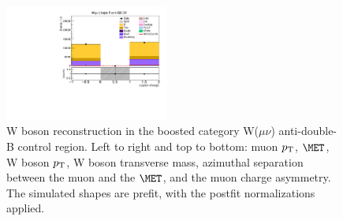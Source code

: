 \begin{figure}[tbp]
\begin{center}
    \includegraphics[width=0.48\textwidth]{figures/wlnhbb2016/boosted/WmnWHTT1bFJCR_lepton1Charge.pdf}
    \caption{W boson reconstruction in the boosted category W($\mu\nu$) anti-double-B control region.
    Left to right and top to bottom: muon $p_{\mathrm{T}}$, $\MET$, W boson $p_{\mathrm{T}}$, W boson transverse mass,
    azimuthal separation between the muon and the $\MET$, and the muon charge asymmetry.
    The simulated shapes are prefit, with the postfit normalizations applied.}
    \label{fig:boost_WmnTT1b_WBosons}
  \end{center}
\end{figure}
\clearpage

